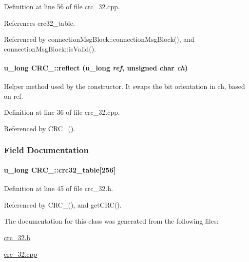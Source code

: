 Definition at line 56 of file crc\_\-32.cpp.

References crc32\_\-table.

Referenced by connection\-Msg\-Block::connection\-Msg\-Block(), and connection\-Msg\-Block::is\-Valid().\hypertarget{classCRC__32_CRC__32b0}{
\paragraph[reflect]{\setlength{\rightskip}{0pt plus 5cm}u\_\-long CRC\_::reflect (u\_\-long {\em ref}, unsigned char {\em ch})}\hfill}
\label{classCRC__32_CRC__32b0}


Helper method used by the constructor. It swaps the bit orientation in ch, based on ref. 

Definition at line 36 of file crc\_\-32.cpp.

Referenced by CRC\_().

\subsubsection{Field Documentation}
\hypertarget{classCRC__32_CRC__32n0}{
\paragraph[crc32\_\-table]{\setlength{\rightskip}{0pt plus 5cm}u\_\-long CRC\_::crc32\_\-table\mbox{[}256\mbox{]}}\hfill}
\label{classCRC__32_CRC__32n0}




Definition at line 45 of file crc\_\-32.h.

Referenced by CRC\_(), and get\-CRC().

The documentation for this class was generated from the following files:\begin{CompactItemize}
\item 
\hyperlink{crc__32_8h}{crc\_\-32.h}\item 
\hyperlink{crc__32_8cpp}{crc\_\-32.cpp}\end{CompactItemize}
